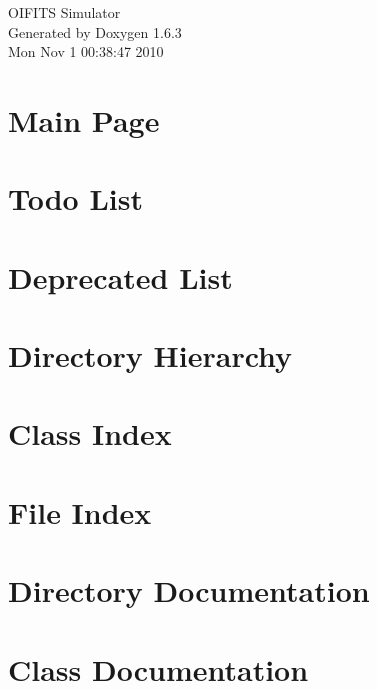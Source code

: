 \documentclass[a4paper]{book}
\begin{document}
\hypersetup{pageanchor=false}
\begin{titlepage}
\vspace*{7cm}
\begin{center}
{\Large OIFITS Simulator }\\
\vspace*{1cm}
{\large Generated by Doxygen 1.6.3}\\
\vspace*{0.5cm}
{\small Mon Nov 1 00:38:47 2010}\\
\end{center}
\end{titlepage}
\clearemptydoublepage
{}
\tableofcontents
\clearemptydoublepage
{}
\hypersetup{pageanchor=true}
\chapter{Main Page}
\label{index}\hypertarget{index}{}
\chapter{Todo List}
\label{todo}
\hypertarget{todo}{}

\chapter{Deprecated List}
\label{deprecated}
\hypertarget{deprecated}{}

\chapter{Directory Hierarchy}

\chapter{Class Index}

\chapter{File Index}

\chapter{Directory Documentation}



\chapter{Class Documentation}





























\end{document}
